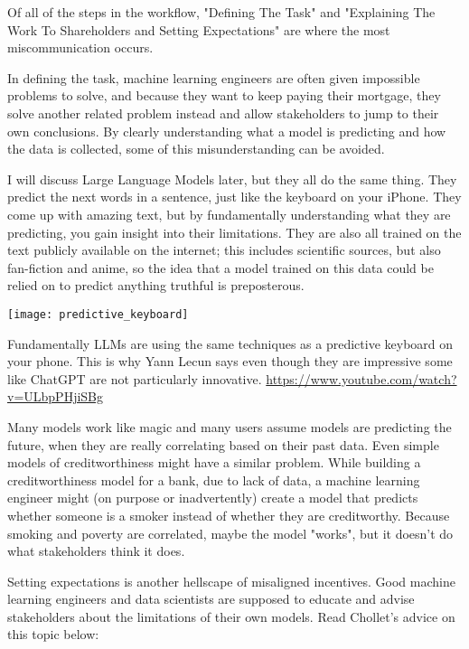 Of all of the steps in the workflow, "Defining The Task" and "Explaining The Work To Shareholders and Setting Expectations" are where the most miscommunication occurs. 

In defining the task, machine learning engineers are often given impossible problems to solve, and because they want to keep paying their mortgage, they solve another related problem instead and allow stakeholders to jump to their own conclusions. By clearly understanding what a model is predicting and how the data is collected, some of this misunderstanding can be avoided.

I will discuss Large Language Models later, but they all do the same thing. They predict the next words in a sentence, just like the keyboard on your iPhone. They come up with amazing text, but by fundamentally understanding what they are predicting, you gain insight into their limitations. They are also all trained on the text publicly available on the internet; this includes scientific sources, but also fan-fiction and anime, so the idea that a model trained on this data could be relied on to predict anything truthful is preposterous.

\begin{pdf}
\begin{marginfigure}[-5.5cm]
        \texttt{[image: predictive\_keyboard]}
        \caption{Fundamentally LLMs are using the same techniques as a predictive keyboard on your phone. This is why Yann Lecun says even though they are impressive some like ChatGPT are not particularly innovative. \url{https://www.youtube.com/watch?v=ULbpPHjiSBg}}
\end{marginfigure}
\end{pdf}

Many models work like magic and many users assume models are predicting the future, when they are really correlating based on their past data. Even simple models of creditworthiness might have a similar problem. While building a creditworthiness model for a bank, due to lack of data, a machine learning engineer might (on purpose or inadvertently) create a model that predicts whether someone is a smoker instead of whether they are creditworthy. Because smoking and poverty are correlated, maybe the model "works", but it doesn’t do what stakeholders think it does.

Setting expectations is another hellscape of misaligned incentives. Good machine learning engineers and data scientists are supposed to educate and advise stakeholders about the limitations of their own models. Read Chollet’s advice on this topic below:


